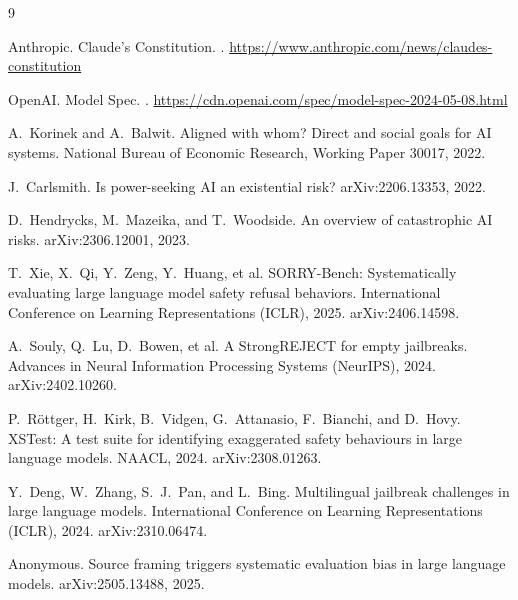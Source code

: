 \documentclass[11pt]{article}
\begin{document}
\begin{thebibliography}{9}

Anthropic.
\newblock Claude's Constitution.
. \url{https://www.anthropic.com/news/claudes-constitution}

OpenAI.
\newblock Model Spec.
. \url{https://cdn.openai.com/spec/model-spec-2024-05-08.html}

A.~Korinek and A.~Balwit.
\newblock Aligned with whom? Direct and social goals for AI systems.
\newblock National Bureau of Economic Research, Working Paper 30017, 2022.

J.~Carlsmith.
\newblock Is power-seeking AI an existential risk?
\newblock arXiv:2206.13353, 2022.

D.~Hendrycks, M.~Mazeika, and T.~Woodside.
\newblock An overview of catastrophic AI risks.
\newblock arXiv:2306.12001, 2023.

T.~Xie, X.~Qi, Y.~Zeng, Y.~Huang, et al.
\newblock SORRY-Bench: Systematically evaluating large language model safety refusal
behaviors.
\newblock International Conference on Learning Representations (ICLR), 2025.
arXiv:2406.14598.

A.~Souly, Q.~Lu, D.~Bowen, et al.
\newblock A StrongREJECT for empty jailbreaks.
\newblock Advances in Neural Information Processing Systems (NeurIPS), 2024.
arXiv:2402.10260.

P.~R\"ottger, H.~Kirk, B.~Vidgen, G.~Attanasio, F.~Bianchi, and D.~Hovy.
\newblock XSTest: A test suite for identifying exaggerated safety behaviours in large
language models.
\newblock NAACL, 2024. arXiv:2308.01263.

Y.~Deng, W.~Zhang, S.~J.~Pan, and L.~Bing.
\newblock Multilingual jailbreak challenges in large language models.
\newblock International Conference on Learning Representations (ICLR), 2024.
arXiv:2310.06474.

Anonymous.
\newblock Source framing triggers systematic evaluation bias in large language models.
\newblock arXiv:2505.13488, 2025.

\end{thebibliography}
\end{document}

